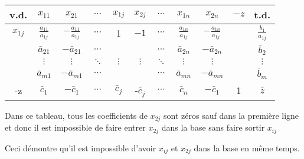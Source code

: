\begin{center}
	\renewcommand{\arraystretch}{1.5}
	\begin{tabular}{|c|ccccccccc|c|}
		\hline
		  v.d.   &        $x_{11}$         &         $x_{21}$         & $\cdots$ &  $x_{1j}$   &   $x_{2j}$   & $\cdots$ &        $x_{1n}$         &         $x_{2n}$         & $-z$ &          t.d.          \\ \hline
		$x_{1j}$ & $\frac{a_{11}}{a_{1j}}$ & $-\frac{a_{11}}{a_{1j}}$ & $\cdots$ &      1      &     $-1$     & $\cdots$ & $\frac{a_{1n}}{a_{1j}}$ & $-\frac{a_{1n}}{a_{1j}}$ &      & $\frac{b_{1}}{a_{1j}}$ \\
		         &     $\bar{a}_{21}$      &     $-\bar{a}_{21}$      & $\cdots$ &             &              & $\cdots$ &     $\bar{a}_{2n}$      &     $-\bar{a}_{2n}$      &      &     $\bar{b}_{2}$      \\
		         &        $\vdots$         &         $\vdots$         & $\ddots$ &  $\vdots$   &   $\vdots$   & $\ddots$ &        $\vdots$         &         $\vdots$         &      &        $\vdots$        \\
		         &     $\bar{a}_{m1}$      &     $-\bar{a}_{m1}$      & $\cdots$ &             &              & $\cdots$ &     $\bar{a}_{mn}$      &     $-\bar{a}_{mn}$      &      &      $\bar{b}_m$       \\ \hline
		   -z    &      $\bar{c}_{1}$      &       $-\bar{c}_1$       & $\cdots$ & $\bar{c}_j$ & -$\bar{c}_j$ & $\cdots$ &       $\bar{c}_n$       &       $-\bar{c}_1$       &  1   &       $\bar{z}$        \\ \hline
	\end{tabular}
\end{center}

Dans ce tableau, tous les coefficients de $x_{2j}$ sont zéros sauf dans la première ligne et donc il est impossible de faire entrer $x_{2j}$ dans la base sans faire sortir $x_{ij}$

Ceci démontre qu’il est impossible d’avoir $x_{ij}$ et $x_{2j}$ dans la base en même temps.
